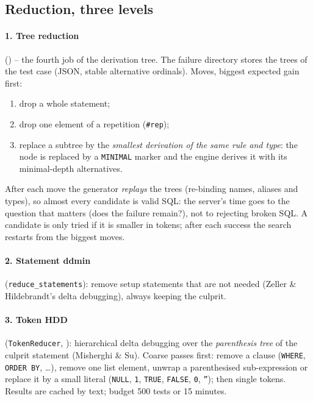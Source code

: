 \subsection{Reduction, three levels}
\label{sec:reduce}

\paragraph{1. Tree reduction} () -- the
fourth job of the derivation tree. The failure directory stores the trees of
the test case (JSON, stable alternative ordinals). Moves, biggest expected gain
first:
\begin{enumerate}
  \item drop a whole statement;
  \item drop one element of a repetition (\texttt{\#rep});
  \item replace a subtree by the \emph{smallest derivation of the same rule and
    type}: the node is replaced by a \texttt{MINIMAL} marker and the engine
    derives it with its minimal-depth alternatives.
\end{enumerate}
After each move the generator \emph{replays} the trees (re-binding names,
aliases and types), so almost every candidate is valid SQL: the server's time
goes to the question that matters (does the failure remain?), not to rejecting
broken SQL. A candidate is only tried if it is smaller in tokens; after each
success the search restarts from the biggest moves.

\paragraph{2. Statement ddmin} (\texttt{reduce\_statements}): remove setup
statements that are not needed (Zeller \& Hildebrandt's delta debugging),
always keeping the culprit.

\paragraph{3. Token HDD} (\texttt{TokenReducer}, ): hierarchical
delta debugging over the \emph{parenthesis tree} of the culprit statement
(Misherghi \& Su). Coarse passes first: remove a clause (\texttt{WHERE},
\texttt{ORDER BY}, \dots), remove one list element, unwrap a parenthesised
sub-expression or replace it by a small literal (\texttt{NULL}, \texttt{1},
\texttt{TRUE}, \texttt{FALSE}, \texttt{0}, \texttt{''}); then single tokens.
Results are cached by text; budget 500 tests or 15 minutes.

